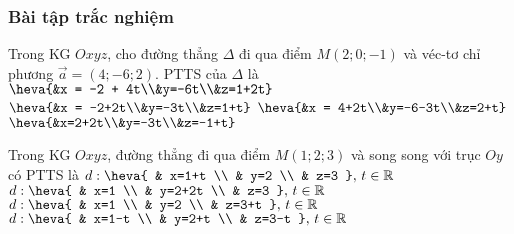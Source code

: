 \subsubsection{Bài tập trắc nghiệm}
	\begin{ex}%
	Trong KG $Oxyz$, cho đường thẳng $\Delta$ đi qua điểm $M(2; 0; -1)$ và véc-tơ chỉ phương $\overrightarrow{a} = (4; -6; 2)$. PTTS của $\Delta$ là
	\choice
	{$\heva{&x = -2 + 4t\\&y=-6t\\&z=1+2t}$}
	{$\heva{&x = -2+2t\\&y=-3t\\&z=1+t}$}
	{$\heva{&x = 4+2t\\&y=-6-3t\\&z=2+t}$}
	{\True $\heva{&x=2+2t\\&y=-3t\\&z=-1+t}$}
	\end{ex}
\begin{ex}%
	Trong KG $Oxyz$, đường thẳng đi qua điểm $M(1;2;3)$ và song song với trục $Oy$ có PTTS là
	\choice
	{$d: \heva{
	& x=1+t \\ 
	& y=2 \\ 
	& z=3
	},\, t\in\mathbb{R}$} 
	{\True $d: \heva{
	& x=1 \\ 
	& y=2+2t \\ 
	& z=3
	},\, t\in\mathbb{R}$} 
	{$d: \heva{
	& x=1 \\ 
	& y=2 \\ 
	& z=3+t
	},\, t\in\mathbb{R}$} 
	{$d: \heva{
	& x=1-t \\ 
	& y=2+t \\ 
	& z=3-t
	} ,\, t\in\mathbb{R}$}
\end{ex}
